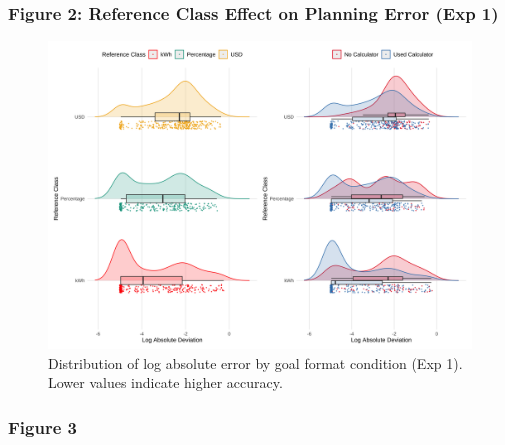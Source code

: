 \documentclass[
  12pt,
]{article}
\begin{document}
\begin{multicols}{3}
\subsubsection{Figure 2: Reference Class Effect on Planning Error (Exp
1)}\label{figure-2-reference-class-effect-on-planning-error-exp-1}

\begin{figure}[H]

{\centering \includegraphics[width=0.8\linewidth,height=\textheight,keepaspectratio]{assets/images/fig-s1-log-dist-1.png}

}

\caption{Distribution of log absolute error by goal format condition
(Exp 1). Lower values indicate higher accuracy.}

\end{figure}%

\subsubsection{Figure 3}\label{figure-3}

\begin{figure}[H]
\centering


\end{figure}
\end{multicols}
\end{document}
